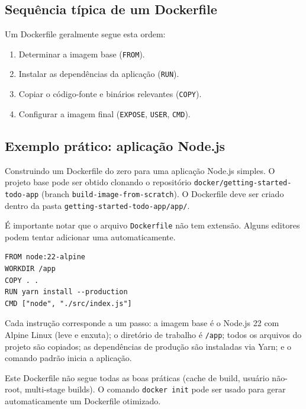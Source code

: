 \subsection{Sequência típica de um Dockerfile}

Um Dockerfile geralmente segue esta ordem:

\begin{enumerate}
    \item Determinar a imagem base (\texttt{FROM}).
    \item Instalar as dependências da aplicação (\texttt{RUN}).
    \item Copiar o código-fonte e binários relevantes (\texttt{COPY}).
    \item Configurar a imagem final (\texttt{EXPOSE}, \texttt{USER}, \texttt{CMD}).
\end{enumerate}

\subsection{Exemplo prático: aplicação Node.js}

Construindo um Dockerfile do zero para uma aplicação Node.js simples. O projeto base pode ser obtido clonando o repositório \texttt{docker/getting-started-todo-app} (branch \texttt{build-image-from-scratch}). O Dockerfile deve ser criado dentro da pasta \texttt{getting-started-todo-app/app/}.

É importante notar que o arquivo \texttt{Dockerfile} não tem extensão. Alguns editores podem tentar adicionar uma automaticamente.

\begin{verbatim}
FROM node:22-alpine
WORKDIR /app
COPY . .
RUN yarn install --production
CMD ["node", "./src/index.js"]
\end{verbatim}

Cada instrução corresponde a um passo: a imagem base é o Node.js 22 com Alpine Linux (leve e enxuta); o diretório de trabalho é \texttt{/app}; todos os arquivos do projeto são copiados; as dependências de produção são instaladas via Yarn; e o comando padrão inicia a aplicação.

Este Dockerfile não segue todas as boas práticas (cache de build, usuário não-root, multi-stage builds). O comando \texttt{docker init} pode ser usado para gerar automaticamente um Dockerfile otimizado.
